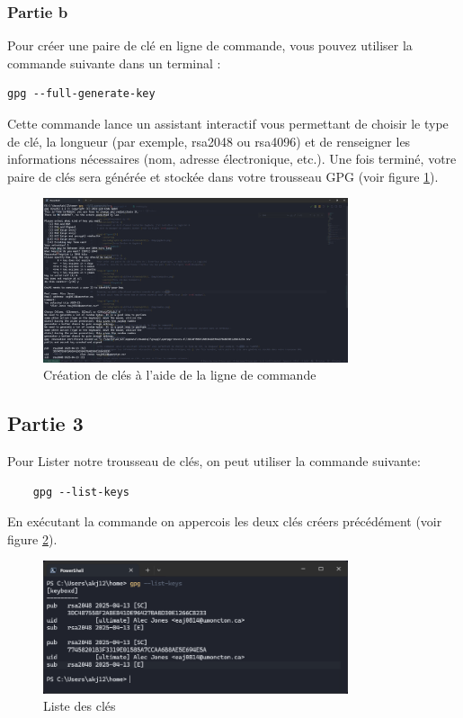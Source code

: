 \documentclass[12pt,a4paper]{article}
\begin{document}
\subsubsection{Partie b}
Pour créer une paire de clé en ligne de commande, vous pouvez utiliser la commande suivante dans un terminal :

\begin{verbatim}
gpg --full-generate-key
\end{verbatim}

Cette commande lance un assistant interactif vous permettant de choisir le type de clé, la longueur (par exemple, rsa2048 ou rsa4096)
et de renseigner les informations nécessaires (nom, adresse électronique, etc.). Une fois terminé, votre paire de clés sera générée et stockée dans votre trousseau GPG (voir figure \ref{newKey_cli}).

\begin{figure}[ht]
    \centering
    \includegraphics[width=0.8\textwidth]{../img/newKey_cli.png}
    \caption{Création de clés à l'aide de la ligne de commande}
    \label{newKey_cli}
\end{figure}

\subsection{Partie 3}
Pour Lister notre trousseau de clés, on peut utiliser la commande suivante:
\begin{verbatim}
    gpg --list-keys
\end{verbatim}
En exécutant la commande on appercois les deux clés créers précédément (voir figure \ref{listKeys}).

\begin{figure}[ht]
    \centering
    \includegraphics[width=0.8\textwidth]{../img/listKeys.png}
    \caption{Liste des clés}
    \label{listKeys}
\end{figure}
\end{document}
